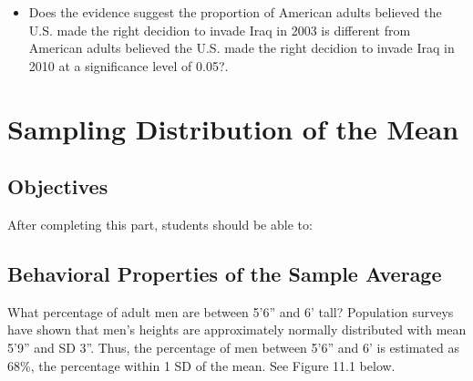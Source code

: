 \documentclass[11pt]{book}\usepackage[]{graphicx}\usepackage[]{color}
\begin{document}
\begin{exercises}
\begin{exercise}
\begin{itemize}
 \item Does the evidence suggest the proportion of  American adults believed the \\ U.S. made the right decidion to invade Iraq in 2003 is different from American adults believed the  U.S. made the right decidion to invade Iraq in 2010 at a significance level of 0.05?.  
\end{itemize}

\end{exercise}
\begin{solution}  %

\end{solution}
\end{exercises}

\onecolumn



\chapter{Sampling Distribution of the Mean}
\label{chap:ch11}

\section{Objectives}

After completing this part, students should be able to:


\section{Behavioral Properties of the Sample Average}

What percentage of adult men are between 5'6'' and 6' tall?  Population surveys have shown that men's heights are approximately normally distributed with mean 5'9'' and SD 3''.  Thus, the percentage of men between 5'6'' and 6' is estimated as 68\%, the percentage within 1 SD of the mean.  See Figure 11.1 below.
\end{document}
